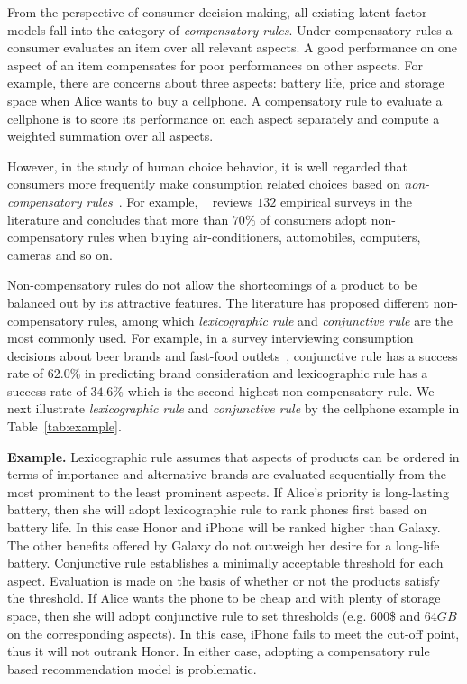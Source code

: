 \documentclass[letterpaper]{article} %
\begin{document}
From the perspective of consumer decision making, all existing latent factor models fall into the category of \emph{compensatory rules}. Under compensatory rules a consumer evaluates an item over all relevant aspects. A good performance on one aspect of an item compensates for poor performances on other aspects. For example, there are concerns about three aspects: battery life, price and storage space when Alice wants to buy a cellphone. A compensatory rule to evaluate a cellphone is to score its performance on each aspect separately and compute a weighted summation over all aspects.


However, in the study of human choice behavior, it is well regarded that consumers more frequently make consumption related choices based on \emph{non-compensatory rules}~\cite{Engel1986Consumer}. For example, ~\cite{Hauser2009Non} reviews $132$ empirical surveys in the literature and concludes that more than $70\%$ of consumers adopt non-compensatory rules when buying air-conditioners, automobiles, computers, cameras and so on. 

Non-compensatory rules do not allow the shortcomings of a product to be balanced out by its attractive features. The literature has proposed different non-compensatory rules, among which  \emph{lexicographic rule} and \emph{conjunctive rule} are the most commonly used. For example, in a survey interviewing consumption decisions about beer brands and fast-food outlets~\cite{Laroche2003Which}, conjunctive rule has a success rate of $62.0\%$ in predicting brand consideration and lexicographic rule has a success rate of $34.6\%$ which is the second highest non-compensatory rule. We next illustrate  \emph{lexicographic rule} and \emph{conjunctive rule}  by the cellphone example in Table~\ref{tab:example}. 

\textbf{Example.} Lexicographic rule assumes that aspects of products can be ordered in terms of importance and alternative brands are evaluated sequentially from the most prominent to the least prominent aspects.  If Alice's priority is long-lasting battery, then she will adopt lexicographic rule to rank phones first based on battery life. In this case Honor and iPhone will be ranked higher than Galaxy. The other benefits offered by Galaxy  do not outweigh her desire for a long-life battery. Conjunctive rule establishes a minimally acceptable threshold for each aspect. Evaluation is made on the basis of whether or not the products satisfy the threshold. If Alice wants the phone to be cheap and with plenty of storage space, then she will adopt conjunctive rule to set thresholds (e.g. $600\$$ and $64GB$ on the corresponding aspects). In this case, iPhone fails to meet the cut-off point, thus it will not outrank Honor. In either case, adopting a compensatory rule based recommendation model is problematic. 
\end{document}

